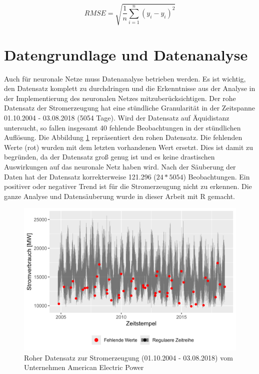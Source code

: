 \documentclass[11pt,ngerman,a4paper,]{article}
\begin{document}
\[
RMSE = \sqrt{\frac{1}{n} \sum_{i=1}^{n}  (y_i - \hat{y_i})^2}
\]

\clearpage
\newpage

\section{Datengrundlage und Datenanalyse}\label{datengrundlage-und-datenanalyse}

Auch für neuronale Netze muss Datenanalyse betrieben werden. Es ist wichtig, den Datensatz komplett zu durchdringen und die Erkenntnisse aus der Analyse in der Implementierung des neuronalen Netzes mitzuberücksichtigen. Der rohe Datensatz der Stromerzeugung hat eine stündliche Granularität in der Zeitspanne 01.10.2004 - 03.08.2018 (5054 Tage). Wird der Datensatz auf Äquidistanz untersucht, so fallen insgesamt 40 fehlende Beobachtungen in der stündlichen Auflösung. Die Abbildung \ref{fig:raw_AEP} repräsentiert den rohen Datensatz. Die fehlenden Werte (rot) wurden mit dem letzten vorhandenen Wert ersetzt. Dies ist damit zu begründen, da der Datensatz groß genug ist und es keine drastischen Auswirkungen auf das neuronale Netz haben wird. Nach der Säuberung der Daten hat der Datensatz korrekterweise 121.296 (\(24*5054\)) Beobachtungen. Ein positiver oder negativer Trend ist für die Stromerzeugung nicht zu erkennen. Die ganze Analyse und Datensäuberung wurde in dieser Arbeit mit R gemacht.

\begin{figure}[H]
\centering
\includegraphics[width=1.0\textwidth]{plots/raw_AEP_MW.png}
\caption{Roher Datensatz zur Stromerzeugung (01.10.2004 - 03.08.2018) vom Unternehmen American Electric Power}
\label{fig:raw_AEP}
\end{figure}
\end{document}
